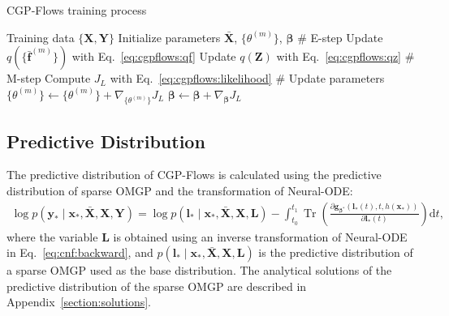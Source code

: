 \documentclass[sn-mathphys-num]{sn-jnl}
\begin{document}
\begin{algorithm}[t]
    \caption{CGP-Flows training process}
    \label{algorithm:CGP-Flows}
    \begin{algorithmic}[1]
        \Require Training data $\{\mathbf{X}, \mathbf{Y}\}$
            \State Initialize parameters $\bar{\mathbf{X}}$, $\{\theta^{(m)}\}$, $\boldsymbol{\beta}$
                \State \# E-step
                    \State Update $q(\{\bar{\mathbf{f}}^{(m)}\})$ with Eq.~\ref{eq:cgpflows:qf}
                    \State Update $q(\mathbf{Z})$ with Eq.~\ref{eq:cgpflows:qz}
                \EndWhile
                \State \# M-step
                    \State Compute $J_{L}$ with Eq.~\ref{eq:cgpflows:likelihood}
                    \State \# Update parameters 
                    \State        $\{\theta^{(m)}\} \leftarrow \{\theta^{(m)}\}+\nabla_{\{\theta^{(m)}\}} J_{L}$
                    \State        $\boldsymbol{\beta} \leftarrow \boldsymbol{\beta}+\nabla_{\boldsymbol{\beta}} J_{L}$
                \EndWhile
            \EndWhile
    \end{algorithmic}
\end{algorithm}





\subsection{Predictive Distribution}
The predictive distribution of CGP-Flows is calculated using the predictive distribution of sparse OMGP and the transformation of Neural-ODE:
\begin{align}\label{eq:cgpflows:predition_distribution}
    \log p(\mathbf{y}_{*}  \mid {\mathbf{x}}_{*}, \bar{\mathbf{X}}, \mathbf X, \mathbf{Y}) 
    = \log p(\mathbf{l}_* \mid \mathbf{x}_*, \bar{\mathbf{X}}, \mathbf X, \mathbf{L}) 
    - \int_{t_0}^{t_1} \operatorname{Tr}\left(\frac{\partial {\mathbf g}_{\boldsymbol{\beta^{*}}}(\mathbf{l}_*(t), t, h(\mathbf x_*))}{\partial \mathbf{l}_*(t)}\right){\mathrm{d}} t,
\end{align}
where the variable $\mathbf L$ is obtained using an inverse transformation of Neural-ODE in Eq.~\ref{eq:cnf:backward}, and $p(\mathbf{l}_* \mid \mathbf{x}_*, \bar{\mathbf{X}}, \mathbf X, \mathbf{L})$ is the predictive distribution of a sparse OMGP used as the base distribution.
The analytical solutions of the predictive distribution of the sparse OMGP are described in Appendix~\ref{section:solutions}.
\end{document}
